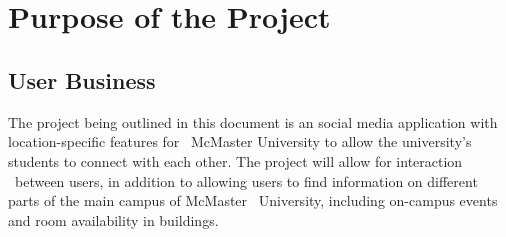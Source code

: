 \documentclass[12pt]{article}
\begin{document}
~\\

~\newpage
\section{Purpose of the Project}
\subsection{User Business}
\quad The project being outlined in this document is an social media application with location-specific features for \
McMaster University to allow the university's students to connect with each other. The project will allow for interaction \
between users, in addition to allowing users to find information on different parts of the main campus of McMaster \
University, including on-campus events and room availability in buildings.
\end{document}
